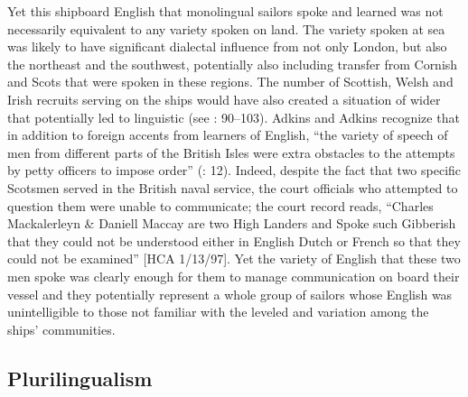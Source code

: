 Yet this shipboard English that monolingual sailors spoke and learned was not necessarily equivalent to any variety spoken on land. The variety spoken at sea was likely to have significant dialectal influence from not only London, but also the northeast and the southwest, potentially also including transfer from Cornish and Scots that were spoken in these regions. The number of Scottish, Welsh and Irish recruits serving on the ships would have also created a situation of wider  that potentially led to linguistic  (see \citealt{Trudgill1986}: 90–103). Adkins and Adkins recognize that in addition to foreign accents from learners of English, “the variety of speech of men from different parts of the British Isles were extra obstacles to the attempts by petty officers to impose order” (\citealt{AdkinsAdkins2008}: 12). Indeed, despite the fact that two specific Scotsmen served in the British naval service, the court officials who attempted to question them were unable to communicate; the court record reads, “Charles Mackalerleyn \& Daniell Maccay are two High Landers and Spoke such Gibberish that they could not be understood either in English Dutch or French so that they could not be examined” [HCA 1/13/97]. Yet the variety of English that these two men spoke was clearly enough for them to manage communication on board their vessel and they potentially represent a whole group of sailors whose English was unintelligible to those not familiar with the leveled  and variation among the ships’ communities. 

\subsection{{Plurilingualism}}\label{sec:3.10.2}

